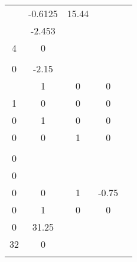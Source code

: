 \documentclass[runningheads,a4paper]{llncs}
\begin{document}
\begin{table}[htb]
\begin{tabular}{|c|c|c|c|c|}
\begin{array}{ccc}
0.6125	& -0.6125	& 15.44 \\
\end{array}\right]$ & 0 \\ \hline
Pendulum   & $\left[\begin{array}{cc}
0		& -2.453	\\
4		& 0			\\	
\end{array}\right]$ & $\left[\begin{array}{c}
4 \\ 0
\end{array}\right]$ & $\left[\begin{array}{cc}
-1.225	& -2.15 	\\
\end{array}\right]$           & 9.8           \\ \hline
\begin{tabular}[c]{@{}c@{}}Inverted\\ Pendulum\end{tabular} & $\left[\begin{array}{cccc}
0		& 1		& 0 	& 0	\\
1		& 0		& 0		& 0	\\
0		& 1 	& 0		& 0 \\
0		& 0		& 1 	& 0 \\	
\end{array}\right]$ & $\left[\begin{array}{c}
1 \\ 0 \\ 0 \\ 0
\end{array}\right]$  & $\left[\begin{array}{cccc}
0	& 0	& 1 & -0.75 \\
0	& 1	& 0	& 0		
\end{array}\right]$ & $\left[\begin{array}{c}
0 \\
0 \end{array}\right]$ \\ \hline
\begin{tabular}[c]{@{}c@{}}Magnetic\\ Suspension\end{tabular} & $\left[\begin{array}{cc}
0		& 31.25	\\
32		& 0		\\	
\end{array}\right]$ & $\left[\begin{array}{c}

\end{array}
\end{tabular}
\end{table}
\end{document}
